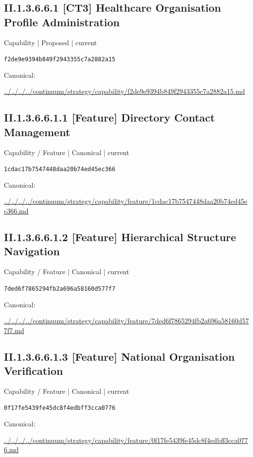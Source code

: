 \documentclass[10pt,a4paper]{article}
\begin{document}
\subsection*{II.1.3.6.6.1 [CT3] Healthcare Organisation Profile Administration}
{\small Capability | Proposed | current}\par
\texttt{f2de9e9394b849f2943355c7a2882a15}\par
Canonical: \par
{\footnotesize\url{../../../../continuum/strategy/capability/f2de9e9394b849f2943355c7a2882a15.md}}\par
\subsection*{II.1.3.6.6.1.1 [Feature] Directory Contact Management}
{\small Capability / Feature | Canonical | current}\par
\texttt{1cdac17b7547448daa20b74ed45ec366}\par
Canonical: \par
{\footnotesize\url{../../../../continuum/strategy/capability/feature/1cdac17b7547448daa20b74ed45ec366.md}}\par
\subsection*{II.1.3.6.6.1.2 [Feature] Hierarchical Structure Navigation}
{\small Capability / Feature | Canonical | current}\par
\texttt{7ded6f7865294fb2a696a58160d577f7}\par
Canonical: \par
{\footnotesize\url{../../../../continuum/strategy/capability/feature/7ded6f7865294fb2a696a58160d577f7.md}}\par
\subsection*{II.1.3.6.6.1.3 [Feature] National Organisation Verification}
{\small Capability / Feature | Canonical | current}\par
\texttt{0f17fe5439fe45dc8f4edbff3cca0776}\par
Canonical: \par
{\footnotesize\url{../../../../continuum/strategy/capability/feature/0f17fe5439fe45dc8f4edbff3cca0776.md}}\par
\end{document}
